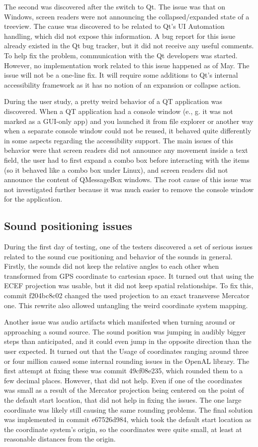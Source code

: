 \documentclass[nolof,digital]{fithesis3}
\begin{document}
The second was discovered after the switch to Qt. The issue was that on Windows, screen readers were not announcing the collapsed/expanded state of a treeview. The cause was discovered to be related to Qt's UI Automation handling, which did not expose this information. A bug report for this issue already existed in the Qt bug tracker, but it did not receive any useful comments. To help fix the problem, communication with the Qt developers was started. However, no implementation work related to this issue happened as of May. The issue will not be a one-line fix. It will require some additions to Qt's internal accessibility framework as it has no notion of an expansion or collapse action.

During the user study, a pretty weird behavior of a QT application was discovered. When a QT application had a console window (e., g. it was not marked as a GUI-only app) and you launched it from file explorer or another way when a separate console window could not be reused, it behaved quite differently in some aspects regarding the accessibility support. The main issues of this behavior were that screen readers did not announce any movement inside a text field, the user had to first expand a combo box before interacting with the items (so it behaved like a combo box under Linux), and screen readers did not announce the content of QMessageBox windows. The root cause of this issue was not investigated further because it was much easier to remove the console window for the application.
\subsection{Sound positioning issues}
During the first day of testing, one of the testers discovered a set of serious issues related to the sound cue positioning and behavior of the sounds in general. Firstly, the sounds did not keep the relative angles to each other when transformed from GPS coordinate to cartesian space. It turned out that using the ECEF projection was usable, but it did not keep spatial relationships. To fix this, commit f204bc8c02 changed the used projection to an exact transverse Mercator one. This rewrite also allowed untangling the weird coordinate system mapping.

Another issue was audio artifacts which manifested when turning around or approaching a sound source. The sound position was jumping in audibly bigger steps than anticipated, and it could even jump in the opposite direction than the user expected. It turned out that the Usage of coordinates ranging around three or four million caused some internal rounding issues in the OpenAL library. The first attempt at fixing these was commit 49cf08e235, which rounded them to a few decimal places. However, that did not help. Even if one of the coordinates was small as a result of the Mercator projection being centered on the point of the default start location, that did not help in fixing the issues. The one large coordinate was likely still causing the same rounding problems. The final solution was implemented in commit e67526d984, which took the default start location as the coordinate system's origin, so the coordinates were quite small, at least at reasonable distances from the origin.
\end{document}
